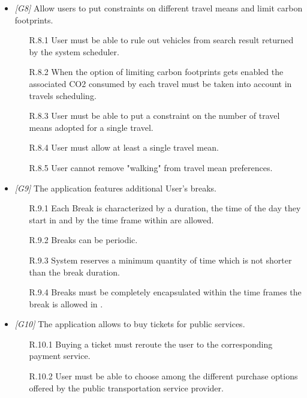 \begin{itemize}
	\item \textit{[G8]} Allow users to put constraints on different travel means and limit carbon footprints.
		\begin{itemize}
			\item[R.8.1] User must be able to rule out vehicles from search result returned by the system scheduler.
			\item[R.8.2] When the option of limiting carbon footprints gets enabled the associated CO2 consumed by each travel must be taken into account in travels scheduling.
			\item[R.8.3] User must be able to put a constraint on the number of travel means adopted for a single travel.
			\item[R.8.4] User must allow at least a single travel mean.
			\item[R.8.5] User cannot remove "walking" from travel mean preferences.
		\end{itemize}


	\item \textit{[G9]} The application features additional User’s breaks.
		\begin{itemize}
			\item [R.9.1] Each Break is characterized by a duration, the time of the day they start in and by the time frame within are allowed.
			\item[R.9.2] Breaks can be periodic.
			\item[R.9.3] System reserves a minimum quantity of time which is not shorter than the break duration.
			\item[R.9.4] Breaks must be completely encapsulated within the time frames the break is allowed in	.
		\end{itemize}


	\item \textit{[G10]} The application allows to buy tickets for public services.
		\begin{itemize}
			\item[R.10.1] Buying a ticket must reroute the user to the corresponding payment service.
			\item[R.10.2] User must be able to choose among the different purchase options offered by the public transportation service provider.
		\end{itemize}



\end{itemize}
